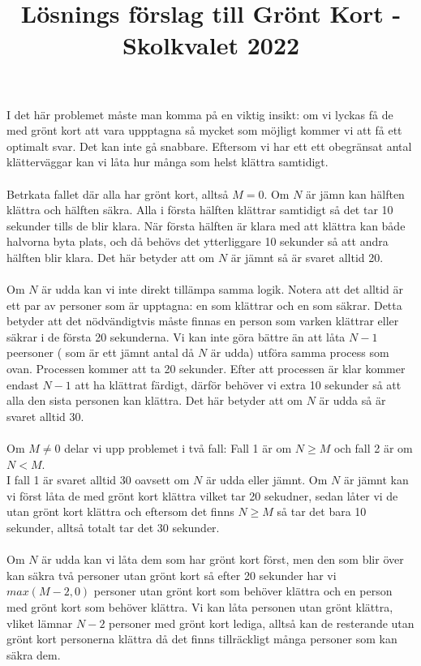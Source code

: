 \documentclass{article}
\title{Lösnings förslag till Grönt Kort - Skolkvalet 2022}
\begin{document}
\maketitle
I det här problemet måste man komma på en viktig insikt: om vi lyckas få de med grönt kort att vara uppptagna så mycket som möjligt kommer vi att få ett optimalt svar. Det kan inte gå snabbare. Eftersom vi har ett ett obegränsat antal klätterväggar kan vi låta hur många som helst klättra samtidigt.\\\\
Betrkata fallet där alla har grönt kort, alltså $M=0$. Om $N$ är jämn kan hälften klättra och hälften säkra. Alla i första hälften klättrar samtidigt så det tar 10 sekunder tills de blir klara. När första hälften är klara med att klättra kan både halvorna byta plats, och då behövs det ytterliggare 10 sekunder så att andra hälften blir klara. Det här betyder att om $N$ är jämnt så är svaret alltid 20.\\\\
Om $N$ är udda kan vi inte direkt tillämpa samma logik. Notera att det alltid är ett par av personer som är upptagna: en som klättrar och en som säkrar. Detta betyder att det nödvändigtvis måste finnas en person som varken klättrar eller säkrar i de första 20 sekunderna. Vi kan inte göra bättre än att låta $N-1$ peersoner ( som är ett jämnt antal då $N$ är udda) utföra samma process som ovan. Processen kommer att ta 20 sekunder. Efter att processen är klar kommer endast $N-1$ att ha klättrat färdigt, därför behöver vi extra 10 sekunder så att alla den sista personen kan klättra. Det här betyder att om $N$ är udda så är svaret alltid 30.\\\\
Om $M \neq 0$ delar vi upp problemet i två fall: Fall 1 är om $N \geq M$ och fall 2 är om $N < M$.\\
I fall 1 är svaret alltid 30 oavsett om $N$ är udda eller jämnt. Om $N$ är jämnt kan vi först låta de med grönt kort klättra vilket tar 20 sekudner, sedan låter vi de utan grönt kort klättra och eftersom det finns $N \geq M$ så tar det bara 10 sekunder, alltså totalt tar det 30 sekunder.\\\\
Om $N$ är udda kan vi låta dem som har grönt kort först, men den som blir över kan säkra två personer utan grönt kort så efter 20 sekunder har vi $max(M -2,0)$ personer utan grönt kort som behöver klättra och en person med grönt kort som behöver klättra. Vi kan låta personen utan grönt klättra, vliket lämnar $N-2$ personer med grönt kort lediga, alltså kan de resterande utan grönt kort personerna klättra då det finns tillräckligt många personer som kan säkra dem.\\\\
\end{document}
